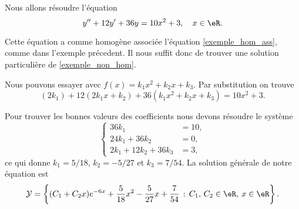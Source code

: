 \begin{example}
   Nous allons résoudre l'équation 
  \begin{equation}
    y'' + 12y' + 36 y = 10x^2+3, \quad x\in\eR. 
  \end{equation}

Cette équation a comme homogène associée l'équation \eqref{exemple_hom_ass}, comme dans l'exemple précedent. Il nous suffit donc de trouver une solution particulière de \eqref{exemple_non_hom}. 

Nous pouvons essayer avec $f(x)= k_1x^2+ k_2x + k_3$. Par substitution on trouve
\begin{equation*}
    \left(2k_1\right)  +12 \left(2k_1x+ k_2\right) + 36\left(k_1x^2+ k_2x + k_3\right)=  10x^2+3. 
\end{equation*}

Pour trouver les bonnes valeurs des coefficients nous devons résoudre le système \begin{equation*}
  \begin{cases}
    36 k_1& = 10, \\
    24k_1 + 36 k_2& = 0,\\
    2k_1 + 12 k_2 + 36 k_3& = 3,
  \end{cases}
\end{equation*}
ce qui donne $k_1= 5/18$, $k_2 = -5/27$ et $k_3 = 7/54$. La solution générale de notre équation est 
\begin{equation*}
   \mathcal{Y}  = \left\{(C_1  +C_2x) e^{-6 x} +\frac{5}{18}x^2 - \frac{5}{27}x + \frac{7}{54} \,:\, C_1,\, C_2 \in \eR, \: x\in \eR\right\}.
\end{equation*}
\end{example}
